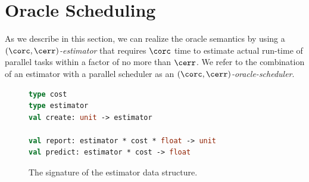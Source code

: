 \section{Oracle Scheduling}
\label{sec:scheduling}

As we
describe in this section, we can realize the oracle semantics by using
a {\em $(\corc,\cerr)$-estimator} that requires $\corc$ time to
estimate actual run-time of parallel tasks within a factor of no more
than $\cerr$.  We refer to the combination of an estimator with a
parallel scheduler as an {\em $(\corc,\cerr)$-oracle-scheduler}. 

\begin{figure}
\small
\begin{lstlisting}[language=ocaml]
type cost
type estimator
val create: unit -> estimator

val report: estimator * cost * float -> unit
val predict: estimator * cost -> float
\end{lstlisting}
\caption{The signature of the estimator data structure.}
\label{fig:estimator-sig}
\end{figure}



